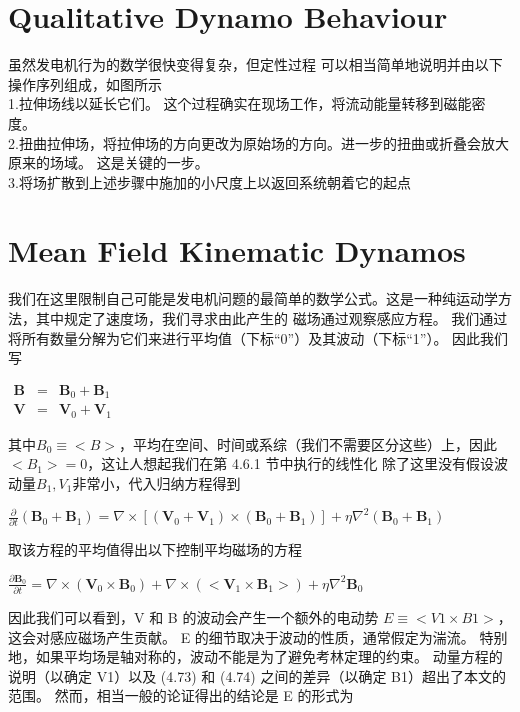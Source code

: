 \documentclass[12pt, a4paper, oneside]{ctexart}
\begin{document}
\begin{spacing}{2.0}
\section{Qualitative Dynamo Behaviour}
虽然发电机行为的数学很快变得复杂，但定性过程
可以相当简单地说明并由以下操作序列组成，如图所示
\\
1.拉伸场线以延长它们。 这个过程确实在现场工作，将流动能量转移到磁能密度。\\
2.扭曲拉伸场，将拉伸场的方向更改为原始场的方向。进一步的扭曲或折叠会放大原来的场域。 这是关键的一步。\\
3.将场扩散到上述步骤中施加的小尺度上以返回系统朝着它的起点\\


\section{Mean Field Kinematic Dynamos}
我们在这里限制自己可能是发电机问题的最简单的数学公式。这是一种纯运动学方法，其中规定了速度场，我们寻求由此产生的
磁场通过观察感应方程。 我们通过将所有数量分解为它们来进行平均值（下标“0”）及其波动（下标“1”）。 因此我们写

\begin{center}
    $\displaystyle\begin{array}{rcl}\mathbf{B}&=&\mathbf{B}_0+\mathbf{B}_1\\ 
        \mathbf{V}&=&\mathbf{V}_0+\mathbf{V}_1\end{array}$
\end{center}
其中$B_0\equiv <B>$，平均在空间、时间或系综（我们不需要区分这些）上，因此$<B_1> = 0$，这让人想起我们在第 4.6.1 节中执行的线性化
除了这里没有假设波动量$B_1, V_1$非常小，代入归纳方程得到

\begin{center}
    $\displaystyle\frac{\partial}{\partial t}\left(\mathbf{B}_0+\mathbf{B}_1\right)=\nabla\times\left[\left(\mathbf{V}_0+\mathbf{V}_1\right)\times\left(\mathbf{B}_0+\mathbf{B}_1\right)\right]+\eta\nabla^2\left(\mathbf{B}_0+\mathbf{B}_1\right)$
\end{center}

取该方程的平均值得出以下控制平均磁场的方程
\begin{center}
    $\displaystyle\frac{\partial\mathbf{B}_0}{\partial t}=\nabla\times(\mathbf{V}_0\times\mathbf{B}_0)+\nabla\times(<\mathbf{V}_1\times\mathbf{B}_1>)+\eta\nabla^2\mathbf{B}_0$
\end{center}

因此我们可以看到，V 和 B 的波动会产生一个额外的电动势 $E ≡ < V1 ×B1 >$，这会对感应磁场产生贡献。 
E 的细节取决于波动的性质，通常假定为湍流。 特别地，如果平均场是轴对称的，波动不能是为了避免考林定理的约束。 
动量方程的说明（以确定 V1）以及 (4.73) 和 (4.74) 之间的差异（以确定 B1）超出了本文的范围。 然而，相当一般的论证得出的结论是 E 的形式为


\end{spacing}
\end{document}
